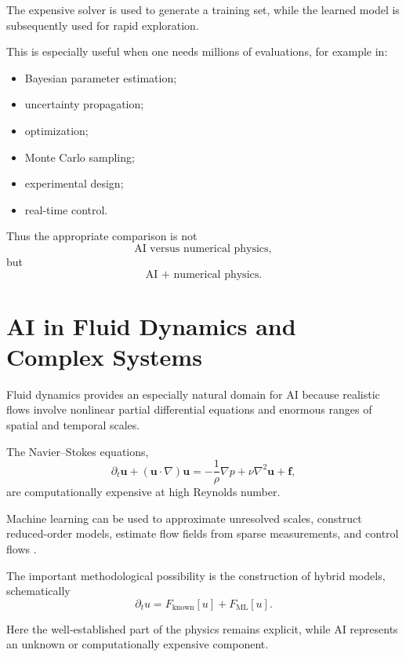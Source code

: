 \documentclass[11pt,a4paper]{article}
\begin{document}
The expensive solver is used to generate a training set, while the learned
model is subsequently used for rapid exploration.

This is especially useful when one needs millions of evaluations, for example
in:

\begin{itemize}
\item Bayesian parameter estimation;
\item uncertainty propagation;
\item optimization;
\item Monte Carlo sampling;
\item experimental design;
\item real-time control.
\end{itemize}

Thus the appropriate comparison is not
\begin{equation}
\text{AI versus numerical physics},
\end{equation}
but
\begin{equation}
\boxed{
\text{AI + numerical physics}
}.
\end{equation}

\section{AI in Fluid Dynamics and Complex Systems}

Fluid dynamics provides an especially natural domain for AI because realistic
flows involve nonlinear partial differential equations and enormous ranges of
spatial and temporal scales.

The Navier--Stokes equations,
\begin{equation}
\partial_t\bm{u}
+
(\bm{u}\cdot\nabla)\bm{u}=
-\frac{1}{\rho}\nabla p
+
\nu\nabla^2\bm{u}
+
\bm{f},
\end{equation}
are computationally expensive at high Reynolds number.

Machine learning can be used to approximate unresolved scales, construct
reduced-order models, estimate flow fields from sparse measurements, and
control flows \cite{Brunton2020,Vinuesa2023}.

The important methodological possibility is the construction of hybrid models,
schematically
\begin{equation}
\partial_t u=
F_{\mathrm{known}}[u]
+
F_{\mathrm{ML}}[u].
\end{equation}

Here the well-established part of the physics remains explicit, while AI
represents an unknown or computationally expensive component.
\end{document}
